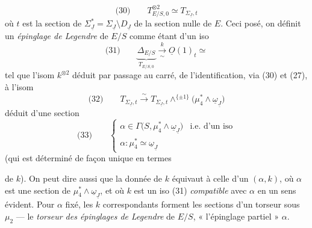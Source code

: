 \documentclass[11pt,a4paper]{article}
\begin{document}
\[
  \text{(30)} \qquad T_{E/S,0}^{\otimes 2} \simeq T_{\Sigma_{\underline{J}},t}
\]
où $t$ est la section de $\Sigma_{\underline{J}}^* = \Sigma_{\underline{J}} \setminus D_{\underline{J}}$
 de la section nulle de $E$. Ceci posé, on définit un
\emph{épinglage de Legendre} de $E/S$ comme étant 
 d'un iso
\[
  \text{(31)} \qquad \underbrace{\Delta_{E/S}}_{T_{E/S,0}}
  \xrightarrow[\;\sim\;]{k} \underline{O}(1)_t \simeq
\]
tel que  l'isom $k^{\otimes 2}$ déduit
par passage au carré,   de l'identification,
via (30) et (27), à l'isom
\[
  \text{(32)} \qquad T_{\Sigma_{\underline{J}},t} \xrightarrow{\;\sim\;}
  T_{\Sigma_{\underline{J}},t} \wedge^{\{\pm 1\}}
  \bigl(\mu_4^{*} \wedge \underline{\omega}_{\underline{J}}\bigr)
\]
déduit d'une section
\[
  \text{(33)} \qquad
  \begin{cases}
    \alpha \in \Gamma\bigl(S, \mu_4^{*} \wedge \underline{\omega}_{\underline{J}}\bigr)
      & \text{i.e.\ d'un iso} \\[2pt]
    \alpha : \mu_4^{*} \simeq \underline{\omega}_{\underline{J}}
  \end{cases}
\]
(qui est déterminé de façon unique en termes

de $k$). On peut dire aussi que la donnée de $k$ équivaut à celle d'un
  $(\alpha, k)$, où $\alpha$ est une section de
$\mu_4^{*} \wedge \underline{\omega}_{\underline{J}}$, et où $k$ est un iso
(31) \emph{compatible} avec $\alpha$ en un sens évident. Pour $\alpha$
fixé, les $k$ correspondants forment les sections d'un torseur sous
$\mu_2$ --- le \emph{torseur des épinglages de Legendre} de $E/S$,
  « l'épinglage partiel » $\alpha$.
\end{document}
